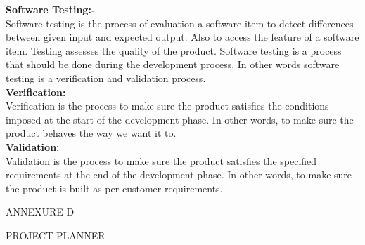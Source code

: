 \documentclass[12pt,a4paper]
{article}
\numberwithin{table}{section}
\begin{document}
{{{{{{{{{\begin{appendices}
\textbf{ Software Testing:-}\\
Software testing is the process of evaluation a software item to detect differences between given input and expected output. Also to access the feature of a software item. Testing assesses the quality of the product. Software testing is a process that should be done during the development process. In other words software testing is a verification and validation process.\\
 \vspace{20 pt}
\textbf{Verification:}\\
Verification is the process to make sure the product satisfies the conditions imposed at the start of the development phase. In other words, to make sure the product behaves the way we want it to.\\
 \vspace{20 pt}
\textbf{Validation:}\\
Validation is the process to make sure the product satisfies the specified requirements at the end of the development phase. In other words, to make sure the product is built as per customer requirements.\\




\newpage
\begin{minipage}{15cm}


\vspace{4 in}
 \begin{center} 
\begin{Huge}

ANNEXURE D

\vspace{0.5 in}
PROJECT PLANNER
\end{Huge}

\end{center}
\end{minipage}




\newpage

\end{appendices}}}}}}}}}}
\end{document}
